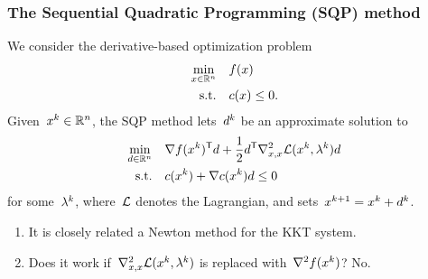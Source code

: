 \documentclass{polyu-presentation}
\newcommand{\con}[1][]{c\ifthenelse{\equal{#1}{}}{}{_{#1}}}
\newcommand{\iter}[1][]{x\ifthenelse{\equal{#1}{}}{}{^{#1}}}
\newcommand{\lag}[1][]{\mathcal{L}\ifthenelse{\equal{#1}{}}{}{^{#1}}}
\newcommand{\lm}[1][]{\lambda\ifthenelse{\equal{#1}{}}{}{^{#1}}}
\newcommand{\obj}{f}
\newcommand{\step}[1][]{d\ifthenelse{\equal{#1}{}}{}{^{#1}}}
\begin{document}
\begin{frame}
    \frametitle{The Sequential Quadratic Programming (SQP) method}

    We consider the \alert{derivative-based}     optimization problem
    \begin{align*}
        \min_{\iter \in \R^n}   & \quad \obj(\iter)\\
        \text{s.t.}             & \quad \con(\iter) \le 0.
    \end{align*}
	Given~$\iter[k] \in \R^n$, the SQP method lets~$\step[k]$ be an approximate solution to
    \begin{align*}
        \min_{\step \in \R^n}   & \quad \nabla \obj(\iter[k])^{\T} \step + \frac{1}{2} \step^{\T} \nabla_{x, x}^2 \lag(\iter[k], \lm[k]) \step\\
        \text{s.t.}             & \quad \con(\iter[k]) + \nabla \con(\iter[k]) \step \le 0
    \end{align*}
    for some~$\lm[k]$, where~$\lag$ denotes the \alert{Lagrangian}, and sets~$\iter[k + 1] = \iter[k] + \step[k]$.
    
    \medskip

    \begin{block}{}
        \begin{enumerate}
            \item It is closely related a \alert{Newton} method for the KKT system.
            \item Does it work if~$\nabla_{x, x}^2 \lag(\iter[k], \lm[k])$ is replaced with~$\nabla^2 \obj(\iter[k])$?
            \pause
            \alert{No}.
        \end{enumerate}
    \end{block}
\end{frame}
\end{document}
